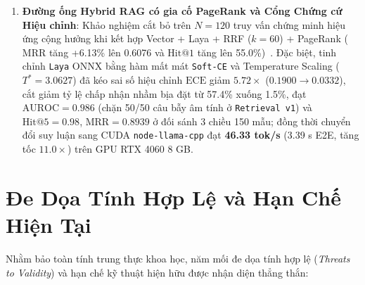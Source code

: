 \begin{enumerate}[label=\textbf{\arabic*.}]
  \item \textbf{Đường ống Hybrid RAG có gia cố PageRank và Cổng Chứng cứ Hiệu chỉnh}: Khảo nghiệm cắt bỏ trên $N=120$ truy vấn chứng minh hiệu ứng cộng hưởng khi kết hợp Vector + Laya + RRF ($k=60$) + PageRank ($\mathrm{MRR}$ tăng +6.13\% lên 0.6076 và $\mathrm{Hit}@1$ tăng lên 55.0\%)~\cite{cormack2009reciprocal}. Đặc biệt, tinh chỉnh \texttt{Laya} ONNX bằng hàm mất mát \texttt{Soft-CE} và Temperature Scaling ($T^* = 3.0627$) đã kéo sai số hiệu chỉnh $\mathrm{ECE}$ giảm $5.72\times$ ($0.1900 \rightarrow 0.0332$), cắt giảm tỷ lệ chấp nhận nhầm bịa đặt từ 57.4\% xuống 1.5\%, đạt \textbf{$\mathrm{AUROC} = 0.986$} (chặn 50/50 câu bẫy âm tính ở \texttt{Retrieval v1}) và \textbf{$\mathrm{Hit}@5 = 0.98$}, \textbf{$\mathrm{MRR} = 0.8939$} ở đối sánh 3 chiều 150 mẫu; đồng thời chuyển đổi suy luận sang CUDA \texttt{node-llama-cpp} đạt \textbf{46.33 tok/s} (3.39 s E2E, tăng tốc $11.0\times$) trên GPU RTX 4060 8 GB.
\end{enumerate}

\section{Đe Dọa Tính Hợp Lệ và Hạn Chế Hiện Tại}
\label{sec:ch7_threats}

Nhằm bảo toàn tính trung thực khoa học, năm mối đe dọa tính hợp lệ (\textit{Threats to Validity}) và hạn chế kỹ thuật hiện hữu được nhận diện thẳng thắn:

